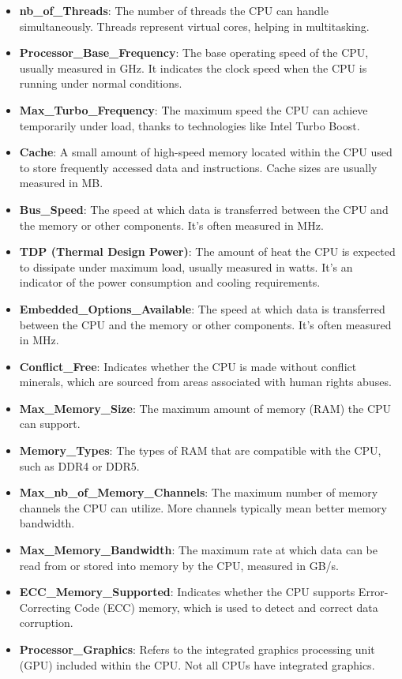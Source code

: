 \documentclass{article}
\begin{document}
\begin{itemize}
		\item \textbf{nb\_of\_Threads}: The number of threads the CPU can handle simultaneously. Threads represent virtual cores, helping in multitasking.
		\item \textbf{Processor\_Base\_Frequency}: The base operating speed of the CPU, usually measured in GHz. It indicates the clock speed when the CPU is running under normal conditions.
		\item \textbf{Max\_Turbo\_Frequency}: The maximum speed the CPU can achieve temporarily under load, thanks to technologies like Intel Turbo Boost.
		\item \textbf{Cache}: A small amount of high-speed memory located within the CPU used to store frequently accessed data and instructions. Cache sizes are usually measured in MB.
		\item \textbf{Bus\_Speed}: The speed at which data is transferred between the CPU and the memory or other components. It’s often measured in MHz.
		\item \textbf{TDP (Thermal Design Power)}: The amount of heat the CPU is expected to dissipate under maximum load, usually measured in watts. It’s an indicator of the power consumption and cooling requirements.
		\item \textbf{Embedded\_Options\_Available}: The speed at which data is transferred between the CPU and the memory or other components. It’s often measured in MHz.
		\item \textbf{Conflict\_Free}: Indicates whether the CPU is made without conflict minerals, which are sourced from areas associated with human rights abuses.
		\item \textbf{Max\_Memory\_Size}: The maximum amount of memory (RAM) the CPU can support.
		\item \textbf{Memory\_Types}: The types of RAM that are compatible with the CPU, such as DDR4 or DDR5.
		\item \textbf{Max\_nb\_of\_Memory\_Channels}: The maximum number of memory channels the CPU can utilize. More channels typically mean better memory bandwidth.
		\item \textbf{Max\_Memory\_Bandwidth}: The maximum rate at which data can be read from or stored into memory by the CPU, measured in GB/s.
		\item \textbf{ ECC\_Memory\_Supported}: Indicates whether the CPU supports Error-Correcting Code (ECC) memory, which is used to detect and correct data corruption.
		\item \textbf{Processor\_Graphics}: Refers to the integrated graphics processing unit (GPU) included within the CPU. Not all CPUs have integrated graphics.

\end{itemize}
\end{document}
